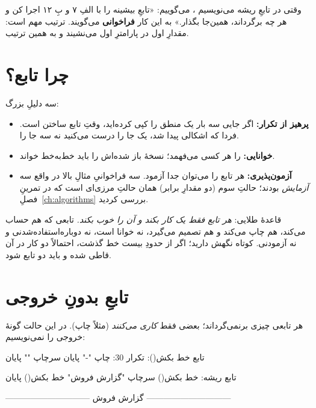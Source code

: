 وقتی در تابعِ ریشه می‌نویسیم ، می‌گوییم: «تابعِ بیشینه
را با الفِ ۷ و بِ ۱۲ اجرا کن و هر چه برگرداند، همین‌جا بگذار.» به این کار
\textbf{فراخوانی} می‌گویند. ترتیب مهم است: مقدارِ اول در پارامترِ اول
می‌نشیند و به همین ترتیب.

\section{چرا تابع؟}

سه دلیلِ بزرگ:

\begin{itemize}
  \item \textbf{پرهیز از تکرار:} اگر جایی سه بار یک منطق را کپی کرده‌اید،
        وقتِ تابع ساختن است. فردا که اشکالی پیدا شد، یک جا را درست
        می‌کنید نه سه جا را.
  \item \textbf{خوانایی:}  را هر کسی می‌فهمد؛
        نسخهٔ باز شده‌اش را باید خط‌به‌خط خواند.
  \item \textbf{آزمون‌پذیری:} هر تابع را می‌توان جدا آزمود. سه فراخوانیِ
        مثالِ بالا در واقع سه \emph{آزمایش} بودند؛ حالتِ سوم (دو مقدارِ
        برابر) همان حالتِ مرزی‌ای است که در تمرینِ فصلِ~\ref{ch:algorithms} بررسی کردید.
\end{itemize}

\begin{tip}
قاعدهٔ طلایی: \emph{هر تابع فقط یک کار بکند و آن را خوب بکند.} تابعی که هم
حساب می‌کند، هم چاپ می‌کند و هم تصمیم می‌گیرد، نه خوانا است، نه
دوباره‌استفاده‌شدنی و نه آزمودنی. کوتاه نگهش دارید؛ اگر از حدودِ بیست خط
گذشت، احتمالاً دو کار در آن قاطی شده و باید دو تابع شود.
\end{tip}

\section{تابعِ بدونِ خروجی}

هر تابعی چیزی برنمی‌گرداند؛ بعضی فقط \emph{کاری می‌کنند} (مثلاً چاپ). در
این حالت گونهٔ خروجی را نمی‌نویسیم:

\begin{salamfa}
تابع خط بکش():
    تکرار 30:
        چاپ "-"
    پایان
    سرچاپ ""
پایان

تابع ریشه:
    خط بکش()
    سرچاپ "گزارش فروش"
    خط بکش()
پایان
\end{salamfa}

\begin{progoutfa}
------------------------------
گزارش فروش
------------------------------
\end{progoutfa}

